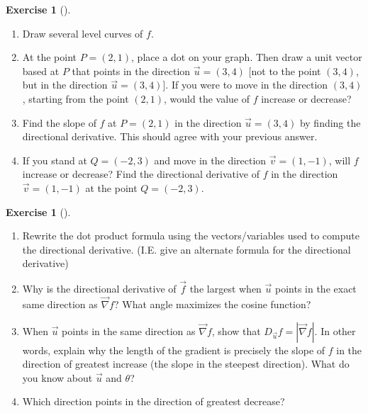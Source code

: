 \documentclass[10pt,]{book}
\theoremstyle{plain}
\theoremstyle{definition}
\theoremstyle{definition}
\theoremstyle{definition}
\theoremstyle{definition}
\newtheorem{exploration}[project]{Exercise}
\theoremstyle{definition}
\numberwithin{equation}{section}
\begin{document}
\begin{exploration}[]\label{exploration-228}
\leavevmode%
\begin{enumerate}[font=\bfseries,label=(\alph*),ref=\alph*]
\item\label{task-605} Draw several level curves of \(f\).%
\item\label{task-606} At the point \(P=(2,1)\), place a dot on your graph. Then draw a unit vector based at \(P\) that points in the direction \(\vec u=(3,4)\) [not to the point \((3,4)\), but in the direction \(\vec u=(3,4)\)]. If you were to move in the direction \((3,4)\), starting from the point \((2,1)\), would the value of \(f\) increase or decrease?%
\item\label{task-607} Find the slope of \(f\) at \(P=(2,1)\) in the direction \(\vec u=(3,4)\) by finding the directional derivative. This should agree with your previous answer.%
\item\label{task-608} If you stand at \(Q=(-2,3)\) and move in the direction \(\vec v= (1,-1)\), will \(f\) increase or decrease?  Find the directional derivative of \(f\) in the direction \(\vec v=(1,-1)\) at the point \(Q=(-2,3)\).%
\end{enumerate}
\end{exploration}
\begin{exploration}[]\label{exploration-229}
\leavevmode%
\begin{enumerate}[font=\bfseries,label=(\alph*),ref=\alph*]
\item\label{task-609} Rewrite the dot product formula using the vectors/variables used to compute the directional derivative. (I.E. give an alternate formula for the directional derivative)%
\item\label{task-610} Why is the directional derivative of \(\vec f\) the largest when \(\vec u\) points in the exact same direction as \(\vec \nabla f\)? What angle maximizes the cosine function?%
%
\item\label{task-611} When \(\vec u\) points in the same direction as \(\vec \nabla f\), show that \(D_{\vec u}f = |\vec \nabla f|\). In other words, explain why the length of the gradient is precisely the slope of \(f\) in the direction of greatest increase (the slope in the steepest direction). What do you know about \(\vec{u}\) and \(\theta\)?%
%
\item\label{task-612} Which direction points in the direction of greatest decrease?%
\end{enumerate}
\end{exploration}
\end{document}
